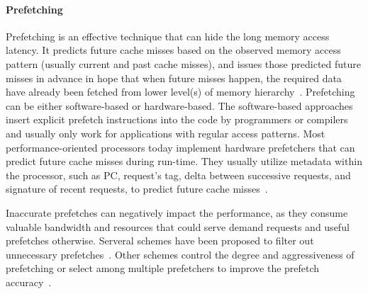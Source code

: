 \paragraph{Prefetching} Prefetching is an effective technique that
can hide the long memory access latency.  It predicts future cache
misses based on the observed memory access pattern (usually current
and past cache misses), and issues those predicted future misses
in advance in hope that when future misses happen, the required
data have already been fetched from lower level(s) of memory
hierarchy~\cite{Vanderwiel:CSUR-2000}.  Prefetching
can be either software-based or hardware-based.  The software-based
approaches insert explicit prefetch instructions into the code by
programmers or compilers and usually only work for applications
with regular access patterns.  Most performance-oriented processors
today implement hardware prefetchers that can predict future cache
misses during run-time.  They usually utilize metadata within the
processor, such as PC, request's tag, delta between successive
requests, and signature of recent requests, to predict future cache
misses~\cite{Fu:MICRO-1992, Chen:TC-1995, Joseph:ISCA-1997,
Kumar:ISCA-1998, Reinman:MICRO-1999, Lin:TC-2001,
Hu:HPCA-2003, Nesbit:HPCA-2004, Somogyi:ISCA-2006,
Manikantan:ICS-2008, Ishii:ICS-2009, Lee:MICRO-2009, 
Ebrahimi:HPCA-2009, Wenisch:HPCA-2009,
Albericio:TACO-2012, Jain:MICRO-2013,
Shevgoor:MICRO-2015, Yu:MICRO-2015, 
Kim:MICRO-2016, Michaud:HPCA-2016,
Zeng:MEMSYS-2017, Bakhshalipour:HPCA-2018,
Hashemi:ICML-2018, Heirman:PACT-2018, Kondguli:ISCA-2018,
Bakhshalipour:HPCA-2019, Bera:MICRO-2019, Wu:MICRO-2019, Wu:ISCA-2019,
Ayers:ASPLOS-2020, Pakalapati:ISCA-2020, 
Bera:MICRO-2021, Vavouliotis:ISCA-2021, Shi:ASPLOS-2021,
Bera:MICRO-2022, Jiang:MICRO-2022, Lurbe:TC-2022,
Litz:ASPLOS-2022, Navarro:MICRO-2022, Vavouliotis:MICRO-2022,
Zhang:SC-2022, Gerogiannis:MICRO-2023, Panda:MICRO-2023, Ainsworth:ISCA-2024, 
Lin:TCAD-2024, Oh:ISCA-2024, Nath:MICRO-2024, Duong:ISCA-2024,
Ai:MICRO-2025, He:MICRO-2025, Li:ISCA-2025, 
Navarro:TC-2025, Xue:TACO-2025, Zhang:TPDS-2025, Chen:HPCA-2025,
Huang:SPAA-2026, Huang:TACO-2026, Jiang:TACO-2026, Bera:HPCA-2026,
Jamet:ISCA-2026, Lin:HPCA-2026, Wang:ISCA-2026, Xu:ASPLOS-2026,
Ye:ISCA-2026, Shao:CAL-2026}.

Inaccurate prefetches can negatively impact the performance, as they
consume valuable bandwidth and resources that could serve demand
requests and useful prefetches otherwise. Serveral schemes have been proposed to
filter out unnecessary prefetches~\cite{Mowry:ASPLOS-1992, 
Charney:IBMJ-1997,
Lin:ICCD-2001, Zhuang:ICPP-2003, Mutlu:CAHPC-2004,
Zhuang:TC-2007,
Panda:CAL-2016, Bhatia:ISCA-2019, Jamet:HPCA-2024,
Vavouliotis:HPCA-2025}.  Other schemes control the degree and
aggressiveness of prefetching or select among multiple prefetchers
to improve the prefetch accuracy~\cite{Hur:MICRO-2006, Srinath:HPCA-2007, 
Ebrahimi:MICRO-2009, Pugsley:HPCA-2014, Panda:TACO-2015, Lee:ICCD-2016, 
Panda:TC-2016, Sridharan:TACO-2017, Yang:TPDS-2025,
Min:CAL-2026, Li:HPCA-2025, Gerogiannis:MICRO-2023}. 

